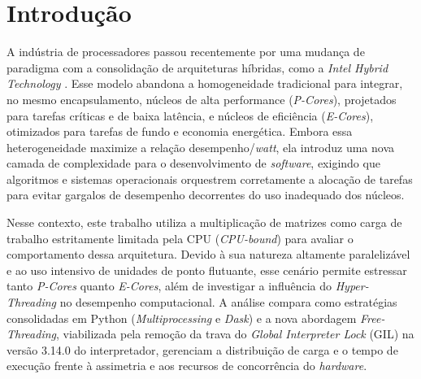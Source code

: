 \documentclass[acmsmall]{acmart}
\begin{document}



\maketitle

\section{Introdução}
A indústria de processadores passou recentemente por uma mudança de paradigma com a consolidação de arquiteturas híbridas, como a \textit{Intel Hybrid Technology} \cite{IntelHybrid}. Esse modelo abandona a homogeneidade tradicional para integrar, no mesmo encapsulamento, núcleos de alta performance (\textit{P-Cores}), projetados para tarefas críticas e de baixa latência, e núcleos de eficiência (\textit{E-Cores}), otimizados para tarefas de fundo e economia energética. Embora essa heterogeneidade maximize a relação desempenho/\textit{watt}, ela introduz uma nova camada de complexidade para o desenvolvimento de \textit{software}, exigindo que algoritmos e sistemas operacionais orquestrem corretamente a alocação de tarefas para evitar gargalos de desempenho decorrentes do uso inadequado dos núcleos.

Nesse contexto, este trabalho utiliza a multiplicação de matrizes como carga de trabalho estritamente limitada pela CPU (\textit{CPU-bound}) para avaliar o comportamento dessa arquitetura. Devido à sua natureza altamente paralelizável e ao uso intensivo de unidades de ponto flutuante, esse cenário permite estressar tanto \textit{P-Cores} quanto \textit{E-Cores}, além de investigar a influência do \textit{Hyper-Threading} no desempenho computacional. A análise compara como estratégias consolidadas em Python (\textit{Multiprocessing} e \textit{Dask}) e a nova abordagem \textit{Free-Threading}, viabilizada pela remoção da trava do \textit{Global Interpreter Lock} (GIL) na versão 3.14.0 do interpretador, gerenciam a distribuição de carga e o tempo de execução frente à assimetria e aos recursos de concorrência do \textit{hardware}.
\end{document}
